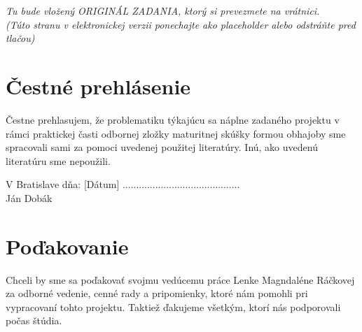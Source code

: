 \documentclass[12pt, a4paper]{article}
\begin{document}
\begin{titlepage}
\newpage
\thispagestyle{empty}
\begin{center}
    \vspace*{8cm}
    \textit{Tu bude vložený ORIGINÁL ZADANIA, ktorý si prevezmete na vrátnici.\\
    (Túto stranu v elektronickej verzii ponechajte ako placeholder alebo odstráňte pred tlačou)}
\end{center}

\newpage
\thispagestyle{empty}
\vspace*{10cm}
\section*{Čestné prehlásenie}
Čestne prehlasujem, že problematiku týkajúcu sa náplne zadaného projektu v rámci praktickej časti odbornej zložky maturitnej skúšky formou obhajoby sme spracovali sami za pomoci uvedenej použitej literatúry. Inú, ako uvedenú literatúru sme nepoužili.

\vspace{2cm}
\noindent V Bratislave dňa: [Dátum] \hfill ...........................................\\
\hspace*{10cm} Ján Dobák

\newpage
\thispagestyle{empty}
\vspace*{10cm}
\section*{Poďakovanie}
Chceli by sme sa poďakovať svojmu vedúcemu práce Lenke Magndaléne Ráčkovej za odborné vedenie, cenné rady a pripomienky, ktoré nám pomohli pri vypracovaní tohto projektu. Taktiež ďakujeme všetkým, ktorí nás podporovali počas štúdia.

\newpage
\thispagestyle{empty}
\tableofcontents

\newpage
\thispagestyle{empty}
\listoffigures
\vspace{1cm}
\listoftables

\newpage
\thispagestyle{empty}

\end{titlepage}
\end{document}
